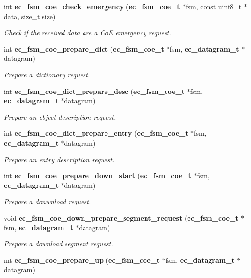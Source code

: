 \begin{DoxyCompactItemize}
int {\bf ec\-\_\-fsm\-\_\-coe\-\_\-check\-\_\-emergency} ({\bf ec\-\_\-fsm\-\_\-coe\-\_\-t} $\ast$fsm, const uint8\-\_\-t $\ast$data, size\-\_\-t size)
\begin{DoxyCompactList}\small\item\em \-Check if the received data are a \-Co\-E emergency request. \end{DoxyCompactList}\item 
int {\bf ec\-\_\-fsm\-\_\-coe\-\_\-prepare\-\_\-dict} ({\bf ec\-\_\-fsm\-\_\-coe\-\_\-t} $\ast$fsm, {\bf ec\-\_\-datagram\-\_\-t} $\ast$datagram)
\begin{DoxyCompactList}\small\item\em \-Prepare a dictionary request. \end{DoxyCompactList}\item 
int {\bf ec\-\_\-fsm\-\_\-coe\-\_\-dict\-\_\-prepare\-\_\-desc} ({\bf ec\-\_\-fsm\-\_\-coe\-\_\-t} $\ast$fsm, {\bf ec\-\_\-datagram\-\_\-t} $\ast$datagram)
\begin{DoxyCompactList}\small\item\em \-Prepare an object description request. \end{DoxyCompactList}\item 
int {\bf ec\-\_\-fsm\-\_\-coe\-\_\-dict\-\_\-prepare\-\_\-entry} ({\bf ec\-\_\-fsm\-\_\-coe\-\_\-t} $\ast$fsm, {\bf ec\-\_\-datagram\-\_\-t} $\ast$datagram)
\begin{DoxyCompactList}\small\item\em \-Prepare an entry description request. \end{DoxyCompactList}\item 
int {\bf ec\-\_\-fsm\-\_\-coe\-\_\-prepare\-\_\-down\-\_\-start} ({\bf ec\-\_\-fsm\-\_\-coe\-\_\-t} $\ast$fsm, {\bf ec\-\_\-datagram\-\_\-t} $\ast$datagram)
\begin{DoxyCompactList}\small\item\em \-Prepare a donwnload request. \end{DoxyCompactList}\item 
void {\bf ec\-\_\-fsm\-\_\-coe\-\_\-down\-\_\-prepare\-\_\-segment\-\_\-request} ({\bf ec\-\_\-fsm\-\_\-coe\-\_\-t} $\ast$fsm, {\bf ec\-\_\-datagram\-\_\-t} $\ast$datagram)
\begin{DoxyCompactList}\small\item\em \-Prepare a download segment request. \end{DoxyCompactList}\item 
int {\bf ec\-\_\-fsm\-\_\-coe\-\_\-prepare\-\_\-up} ({\bf ec\-\_\-fsm\-\_\-coe\-\_\-t} $\ast$fsm, {\bf ec\-\_\-datagram\-\_\-t} $\ast$datagram)

\end{DoxyCompactItemize}
